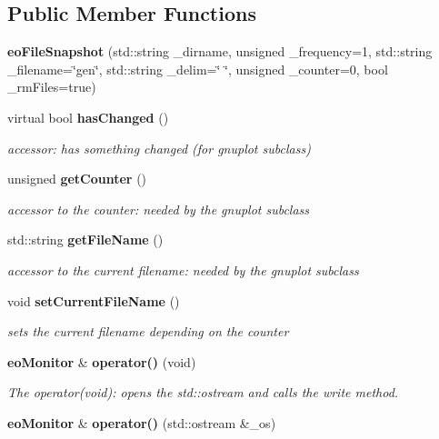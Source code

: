 \subsection*{Public Member Functions}
\begin{CompactItemize}
\item 
{\bf eo\-File\-Snapshot} (std::string \_\-dirname, unsigned \_\-frequency=1, std::string \_\-filename=\char`\"{}gen\char`\"{}, std::string \_\-delim=\char`\"{} \char`\"{}, unsigned \_\-counter=0, bool \_\-rm\-Files=true)\label{classeo_file_snapshot_a0}

\item 
virtual bool {\bf has\-Changed} ()\label{classeo_file_snapshot_a1}

\begin{CompactList}\small\item\em accessor: has something changed (for gnuplot subclass) \item\end{CompactList}\item 
unsigned {\bf get\-Counter} ()\label{classeo_file_snapshot_a2}

\begin{CompactList}\small\item\em accessor to the counter: needed by the gnuplot subclass \item\end{CompactList}\item 
std::string {\bf get\-File\-Name} ()\label{classeo_file_snapshot_a3}

\begin{CompactList}\small\item\em accessor to the current filename: needed by the gnuplot subclass \item\end{CompactList}\item 
void {\bf set\-Current\-File\-Name} ()\label{classeo_file_snapshot_a4}

\begin{CompactList}\small\item\em sets the current filename depending on the counter \item\end{CompactList}\item 
{\bf eo\-Monitor} \& {\bf operator()} (void)\label{classeo_file_snapshot_a5}

\begin{CompactList}\small\item\em The operator(void): opens the std::ostream and calls the write method. \item\end{CompactList}\item 
{\bf eo\-Monitor} \& {\bf operator()} (std::ostream \&\_\-os)\label{classeo_file_snapshot_a6}


\end{CompactItemize}
